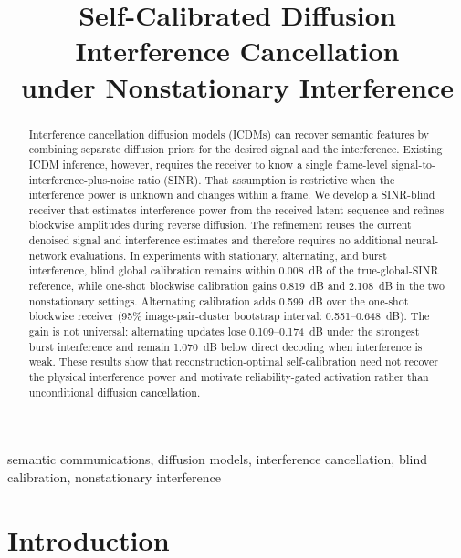 \documentclass[conference]{IEEEtran}
\begin{document}
\title{Self-Calibrated Diffusion Interference Cancellation\\
under Nonstationary Interference}

\author{
}

\maketitle

\begin{abstract}
Interference cancellation diffusion models (ICDMs) can recover semantic
features by combining separate diffusion priors for the desired signal and
the interference. Existing ICDM inference, however, requires the receiver to
know a single frame-level signal-to-interference-plus-noise ratio (SINR).
That assumption is restrictive when the interference power is unknown and
changes within a frame. We develop a SINR-blind receiver that estimates
interference power from the received latent sequence and refines blockwise
amplitudes during reverse diffusion. The refinement reuses the current
denoised signal and interference estimates and therefore requires no
additional neural-network evaluations. In experiments with stationary,
alternating, and burst interference, blind global calibration remains within
0.008~dB of the true-global-SINR reference, while one-shot blockwise
calibration gains 0.819~dB and 2.108~dB in the two nonstationary settings.
Alternating calibration adds 0.599~dB over the one-shot blockwise receiver
(95\% image-pair-cluster bootstrap interval: 0.551--0.648~dB). The gain is
not universal: alternating updates lose 0.109--0.174~dB under the strongest
burst interference and remain 1.070~dB below direct decoding when
interference is weak. These results show that reconstruction-optimal
self-calibration need not recover the physical interference power and
motivate reliability-gated activation rather than unconditional diffusion
cancellation.
\end{abstract}

\begin{IEEEkeywords}
semantic communications, diffusion models, interference cancellation,
blind calibration, nonstationary interference
\end{IEEEkeywords}

\section{Introduction}
\end{document}
